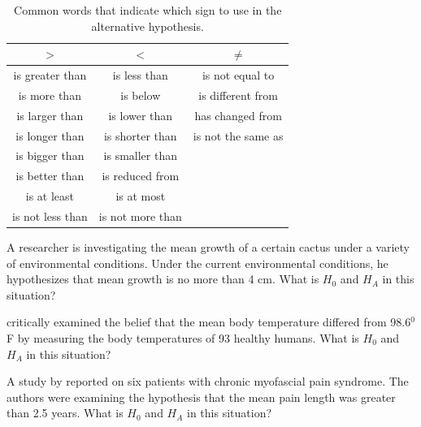 \documentclass[10pt,openany]{book}\usepackage[]{graphicx}\usepackage[]{color}
\begin{document}
\begin{table}[htbp]
  \caption{Common words that indicate which sign to use in the alternative hypothesis.}
  \label{tab:HAwords}
  \centering
  \begin{tabular}{ccc}
\hline\hline
$>$ & $<$ & $\neq$ \\
\hline
is greater than & is less than & is not equal to \\
is more than & is below & is different from \\
is larger than & is lower than & has changed from \\
is longer than & is shorter than & is not the same as \\
is bigger than & is smaller than &  \\
is better than & is reduced from &  \\
is at least & is at most &  \\
is not less than & is not more than &  \\
\hline\hline
  \end{tabular}
\end{table}


\begin{exsection}
  \item \label{revex:HypTCactus} A researcher is investigating the mean growth of a certain cactus under a variety of environmental conditions. Under the current environmental conditions, he hypothesizes that mean growth is no more than 4 cm. What is $H_{0}$ and $H_{A}$ in this situation? 
  \item \label{revex:HypTBodyTemp} \cite{Machowiaketal1992} critically examined the belief that the mean body temperature differed from 98.6$^{0}$F by measuring the body temperatures of 93 healthy humans.  What is $H_{0}$ and $H_{A}$ in this situation? 
  \item \label{revex:HypTPain} A study by \cite{Cheshireetal1994} reported on six patients with chronic myofascial pain syndrome. The authors were examining the hypothesis that the mean pain length was greater than 2.5 years.  What is $H_{0}$ and $H_{A}$ in this situation? 
\end{exsection}
\end{document}
